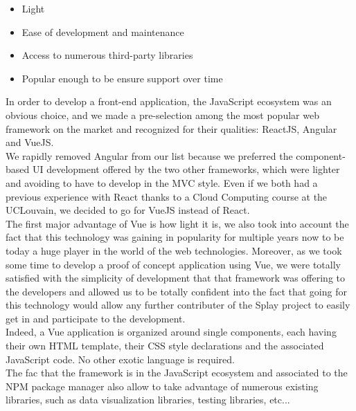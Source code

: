 \documentclass{eplmastersthesis}
\begin{document}
        \begin{itemize}
          \item Light
          \item Ease of development and maintenance
          \item Access to numerous third-party libraries
          \item Popular enough to be ensure support over time
        \end{itemize}

        In order to develop a front-end application, the JavaScript ecosystem
        was an obvious choice, and we made a pre-selection among the most
        popular web framework on the market and recognized for their qualities:
        ReactJS, Angular and VueJS.\\
        We rapidly removed Angular from our list because we preferred the
        component-based UI development offered by the two other frameworks,
        which were lighter and avoiding to have to develop in the MVC style.
        Even if we both had a previous experience with React thanks to a
        Cloud Computing course at the UCLouvain, we decided to go for VueJS
        instead of React.\\

        The first major advantage of Vue is how light it is, we also took into
        account the fact that this technology was gaining in popularity for
        multiple years now to be today a huge player in the world of the web
        technologies. Moreover, as we took some time to develop a proof
        of concept application using Vue, we were totally satisfied with the
        simplicity of development that that framework was offering to the
        developers and allowed us to be totally confident into the fact
        that going for this technology would allow any further contributer
        of the Splay project to easily get in and participate to the
        development.\\
        Indeed, a Vue application is organized around single components, each
        having their own HTML template, their CSS style declarations and
        the associated JavaScript code. No other exotic language is required.\\
        The fac that the framework is in the JavaScript ecosystem and
        associated to the NPM package manager also allow to take advantage of
        numerous existing libraries, such as data visualization libraries,
        testing libraries, etc... \\
\end{document}
